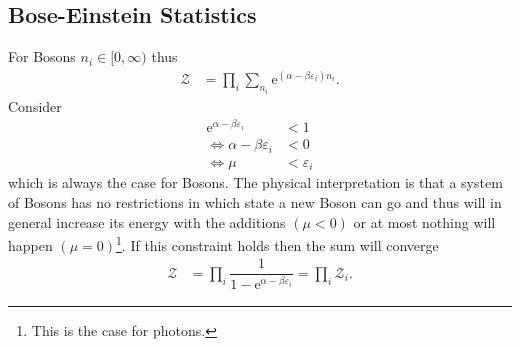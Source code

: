 \documentclass[a4paper,10pt]{article}
\numberwithin{equation}{section}
\begin{document}
\begin{multicols}{2}
\subsection{Bose-Einstein Statistics}
For Bosons $n_i  \in [0,\infty)$ thus
\begin{align} 
  \mathcal{Z} &= \prod_{i}^{}\sum_{n_i}^{}\text{e}^{(\alpha -\beta \varepsilon _i)n_i}
.\end{align} 
Consider
\begin{align} 
  \text{e}^{\alpha -\beta \varepsilon _i}&<1\\
  \Leftrightarrow \alpha -\beta \varepsilon _i&<0\\
  \Leftrightarrow \mu &<\varepsilon _i
\end{align} 
which is always the case for Bosons.
The physical interpretation is that a system of Bosons has no restrictions in which state a new Boson can go and thus will in general increase its energy with the additions $(\mu <0)$ or at most nothing will happen $(\mu =0)$\footnote{This is the case for photons.}.
If this constraint holds then the sum will converge
\begin{align} 
  \mathcal{Z} &= \prod_{i}^{}\dfrac{1}{1-\text{e}^{\alpha -\beta \varepsilon _i}}=\prod_{i}^{}\mathcal{Z}_i
.\end{align} 


\end{multicols}
\end{document}
